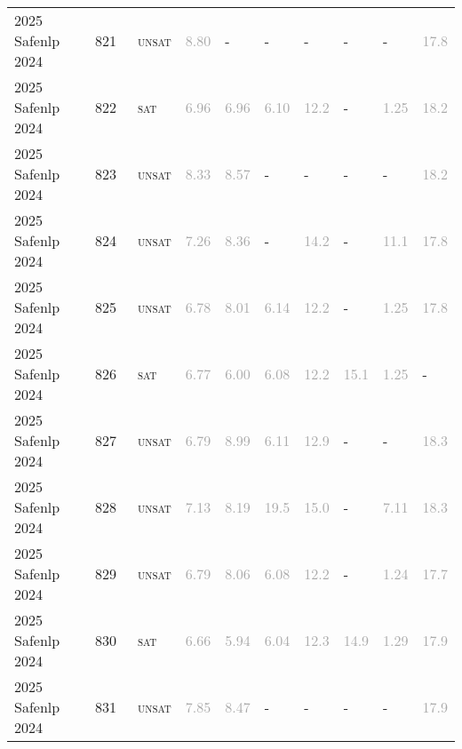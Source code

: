 \begin{center}
{\begin{longtable}{@{}llllllllll@{}}
2025 Safenlp 2024 & 821 & ~\textsc{unsat} & \textcolor{darkgray}{8.80} & - & - & - & - & - & \textcolor{darkgray}{17.8} \\
2025 Safenlp 2024 & 822 & ~\textsc{sat} & \textcolor{darkgray}{6.96} & \textcolor{darkgray}{6.96} & \textcolor{darkgray}{6.10} & \textcolor{darkgray}{12.2} & - & \textcolor{darkgray}{1.25} & \textcolor{darkgray}{18.2} \\
2025 Safenlp 2024 & 823 & ~\textsc{unsat} & \textcolor{darkgray}{8.33} & \textcolor{darkgray}{8.57} & - & - & - & - & \textcolor{darkgray}{18.2} \\
2025 Safenlp 2024 & 824 & ~\textsc{unsat} & \textcolor{darkgray}{7.26} & \textcolor{darkgray}{8.36} & - & \textcolor{darkgray}{14.2} & - & \textcolor{darkgray}{11.1} & \textcolor{darkgray}{17.8} \\
2025 Safenlp 2024 & 825 & ~\textsc{unsat} & \textcolor{darkgray}{6.78} & \textcolor{darkgray}{8.01} & \textcolor{darkgray}{6.14} & \textcolor{darkgray}{12.2} & - & \textcolor{darkgray}{1.25} & \textcolor{darkgray}{17.8} \\
2025 Safenlp 2024 & 826 & ~\textsc{sat} & \textcolor{darkgray}{6.77} & \textcolor{darkgray}{6.00} & \textcolor{darkgray}{6.08} & \textcolor{darkgray}{12.2} & \textcolor{darkgray}{15.1} & \textcolor{darkgray}{1.25} & - \\
2025 Safenlp 2024 & 827 & ~\textsc{unsat} & \textcolor{darkgray}{6.79} & \textcolor{darkgray}{8.99} & \textcolor{darkgray}{6.11} & \textcolor{darkgray}{12.9} & - & - & \textcolor{darkgray}{18.3} \\
2025 Safenlp 2024 & 828 & ~\textsc{unsat} & \textcolor{darkgray}{7.13} & \textcolor{darkgray}{8.19} & \textcolor{darkgray}{19.5} & \textcolor{darkgray}{15.0} & - & \textcolor{darkgray}{7.11} & \textcolor{darkgray}{18.3} \\
2025 Safenlp 2024 & 829 & ~\textsc{unsat} & \textcolor{darkgray}{6.79} & \textcolor{darkgray}{8.06} & \textcolor{darkgray}{6.08} & \textcolor{darkgray}{12.2} & - & \textcolor{darkgray}{1.24} & \textcolor{darkgray}{17.7} \\
2025 Safenlp 2024 & 830 & ~\textsc{sat} & \textcolor{darkgray}{6.66} & \textcolor{darkgray}{5.94} & \textcolor{darkgray}{6.04} & \textcolor{darkgray}{12.3} & \textcolor{darkgray}{14.9} & \textcolor{darkgray}{1.29} & \textcolor{darkgray}{17.9} \\
2025 Safenlp 2024 & 831 & ~\textsc{unsat} & \textcolor{darkgray}{7.85} & \textcolor{darkgray}{8.47} & - & - & - & - & \textcolor{darkgray}{17.9} \\

\end{longtable}}
\end{center}
